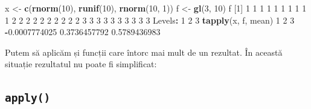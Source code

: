 \documentclass[]{article}
\newenvironment{Shaded}{\begin{snugshade}}{\end{snugshade}}
\newcommand{\KeywordTok}[1]{\textcolor[rgb]{0.13,0.29,0.53}{\textbf{#1}}}
\newcommand{\DataTypeTok}[1]{\textcolor[rgb]{0.13,0.29,0.53}{#1}}
\newcommand{\DecValTok}[1]{\textcolor[rgb]{0.00,0.00,0.81}{#1}}
\newcommand{\FloatTok}[1]{\textcolor[rgb]{0.00,0.00,0.81}{#1}}
\newcommand{\StringTok}[1]{\textcolor[rgb]{0.31,0.60,0.02}{#1}}
\newcommand{\OperatorTok}[1]{\textcolor[rgb]{0.81,0.36,0.00}{\textbf{#1}}}
\newcommand{\NormalTok}[1]{#1}
\begin{document}
\begin{Shaded}
\begin{Highlighting}[]
\NormalTok{x <-}\StringTok{ }\KeywordTok{c}\NormalTok{(}\KeywordTok{rnorm}\NormalTok{(}\DecValTok{10}\NormalTok{), }\KeywordTok{runif}\NormalTok{(}\DecValTok{10}\NormalTok{), }\KeywordTok{rnorm}\NormalTok{(}\DecValTok{10}\NormalTok{, }\DecValTok{1}\NormalTok{))}
\NormalTok{f <-}\StringTok{ }\KeywordTok{gl}\NormalTok{(}\DecValTok{3}\NormalTok{, }\DecValTok{10}\NormalTok{)   }
\NormalTok{f}
\NormalTok{ [}\DecValTok{1}\NormalTok{] }\DecValTok{1} \DecValTok{1} \DecValTok{1} \DecValTok{1} \DecValTok{1} \DecValTok{1} \DecValTok{1} \DecValTok{1} \DecValTok{1} \DecValTok{1} \DecValTok{2} \DecValTok{2} \DecValTok{2} \DecValTok{2} \DecValTok{2} \DecValTok{2} \DecValTok{2} \DecValTok{2} \DecValTok{2} \DecValTok{2} \DecValTok{3} \DecValTok{3} \DecValTok{3} \DecValTok{3} \DecValTok{3} \DecValTok{3} \DecValTok{3} \DecValTok{3} \DecValTok{3} \DecValTok{3}
\NormalTok{Levels}\OperatorTok{:}\StringTok{ }\DecValTok{1} \DecValTok{2} \DecValTok{3}
\KeywordTok{tapply}\NormalTok{(x, f, mean)}
            \DecValTok{1}             \DecValTok{2}             \DecValTok{3} 
\OperatorTok{-}\FloatTok{0.0007774025}  \FloatTok{0.3736457792}  \FloatTok{0.5789436983} 
\end{Highlighting}
\end{Shaded}

Putem să aplicăm și funcții care întorc mai mult de un rezultat. În
această situație rezultatul nu poate fi simplificat:

\begin{Shaded}
\end{Shaded}

\subsection{\texorpdfstring{\texttt{apply()}}{apply()}}\label{apply}
\end{document}
